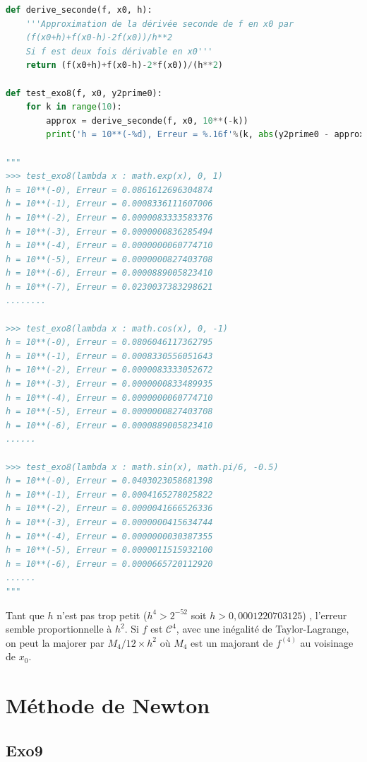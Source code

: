 \documentclass[
  11pt,
]{article}
\newcounter{exo}
\newcounter{prop}
\newcounter{def}
\begin{document}
\begin{lstlisting}[language=Python]
def derive_seconde(f, x0, h):
    '''Approximation de la dérivée seconde de f en x0 par 
    (f(x0+h)+f(x0-h)-2f(x0))/h**2
    Si f est deux fois dérivable en x0'''
    return (f(x0+h)+f(x0-h)-2*f(x0))/(h**2)

def test_exo8(f, x0, y2prime0):
    for k in range(10):
        approx = derive_seconde(f, x0, 10**(-k))
        print('h = 10**(-%d), Erreur = %.16f'%(k, abs(y2prime0 - approx)))
  
"""
>>> test_exo8(lambda x : math.exp(x), 0, 1)
h = 10**(-0), Erreur = 0.0861612696304874
h = 10**(-1), Erreur = 0.0008336111607006
h = 10**(-2), Erreur = 0.0000083333583376
h = 10**(-3), Erreur = 0.0000000836285494
h = 10**(-4), Erreur = 0.0000000060774710
h = 10**(-5), Erreur = 0.0000000827403708
h = 10**(-6), Erreur = 0.0000889005823410
h = 10**(-7), Erreur = 0.0230037383298621
........

>>> test_exo8(lambda x : math.cos(x), 0, -1)
h = 10**(-0), Erreur = 0.0806046117362795
h = 10**(-1), Erreur = 0.0008330556051643
h = 10**(-2), Erreur = 0.0000083333052672
h = 10**(-3), Erreur = 0.0000000833489935
h = 10**(-4), Erreur = 0.0000000060774710
h = 10**(-5), Erreur = 0.0000000827403708
h = 10**(-6), Erreur = 0.0000889005823410
......

>>> test_exo8(lambda x : math.sin(x), math.pi/6, -0.5)
h = 10**(-0), Erreur = 0.0403023058681398
h = 10**(-1), Erreur = 0.0004165278025822
h = 10**(-2), Erreur = 0.0000041666526336
h = 10**(-3), Erreur = 0.0000000415634744
h = 10**(-4), Erreur = 0.0000000030387355
h = 10**(-5), Erreur = 0.0000011515932100
h = 10**(-6), Erreur = 0.0000665720112920
......
"""
\end{lstlisting}

Tant que \(h\) n'est pas trop petit (\(h^4 > 2^{-52}\) soit
\(h > 0,0001220703125\)) , l'erreur semble proportionnelle à \(h^2\). Si
\(f\) est \(\mathcal{C}^4\), avec une inégalité de Taylor-Lagrange, on
peut la majorer par \(M_4/12 \times h^2\) où \(M_4\) est un majorant de
\(f^{(4)}\) au voisinage de \(x_0\).

\hypertarget{muxe9thode-de-newton}{%
\section{Méthode de Newton}\label{muxe9thode-de-newton}}

\hypertarget{exo9}{%
\subsection{Exo9}\label{exo9}}
\end{document}
